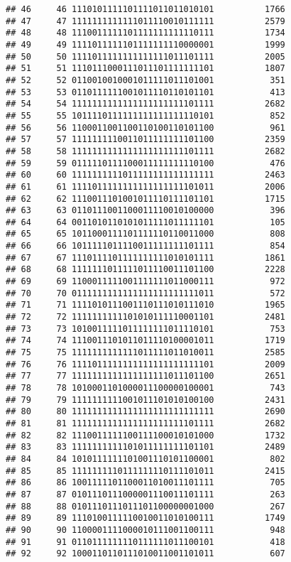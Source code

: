 \documentclass[]{article}
\begin{document}
\begin{verbatim}
## 46     46 1110101111101111011011010101          1766
## 47     47 1111111111111011110010111111          2579
## 48     48 1110011111101111111111110111          1734
## 49     49 1111011111101111111110000001          1999
## 50     50 1111011111111111111011101111          2005
## 51     51 1110111000111011101111111101          1807
## 52     52 0110010010001011111011101001           351
## 53     53 0110111111001011110110101101           413
## 54     54 1111111111111111111111101111          2682
## 55     55 1011110111111111111111110101           852
## 56     56 1100011001100110100110101100           961
## 57     57 1111111110011011111111101100          2359
## 58     58 1111111111111111111111101111          2682
## 59     59 0111110111100011111111110100           476
## 60     60 1111111111011111111111111111          2463
## 61     61 1111011111111111111111101011          2006
## 62     62 1110011101001011110111101101          1715
## 63     63 0110111001100011110010100000           396
## 64     64 0011010110101011111011111101           105
## 65     65 1011000111101111110110011000           808
## 66     66 1011111011110011111111101111           854
## 67     67 1110111101111111111010101111          1861
## 68     68 1111111011111011110011101100          2228
## 69     69 1100011111001111111011000111           972
## 70     70 0111111111111111111111111011           572
## 71     71 1111010111001110111010111010          1965
## 72     72 1111111111101010111110001101          2481
## 73     73 1010011111011111111011110101           753
## 74     74 1110011101011011110100001011          1719
## 75     75 1111111111111011111011010011          2585
## 76     76 1111011111111111111111111101          2009
## 77     77 1111111111111111111011101100          2651
## 78     78 1010001101000011100000100001           743
## 79     79 1111111111001011101010100100          2431
## 80     80 1111111111111111111111111111          2690
## 81     81 1111111111111111111111101111          2682
## 82     82 1110011111100111100010101000          1732
## 83     83 1111111111101011111111101101          2489
## 84     84 1010111111101001110101100001           802
## 85     85 1111111110111111110111101011          2415
## 86     86 1001111101100011010011101111           705
## 87     87 0101110111000001110011101111           263
## 88     88 0101110111011101100000001000           267
## 89     89 1110100111110010011010100111          1749
## 90     90 1100001111000010111001100111           948
## 91     91 0110111111110111111011100101           418
## 92     92 1000110110111010011001101011           607

\end{verbatim}
\end{document}
